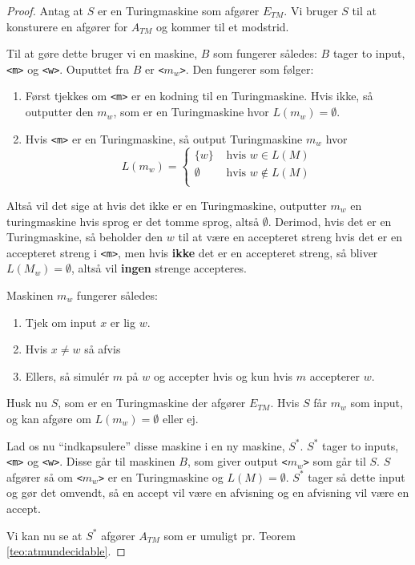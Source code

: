 \begin{proof}
	Antag at $S$ er en Turingmaskine som afgører $E_{TM}$. Vi bruger $S$ til at konsturere en afgører for $A_{TM}$ og kommer til et modstrid.

	Til at gøre dette bruger vi en maskine, $B$ som fungerer således: $B$ tager to input, \texttt{<m>} og \texttt{<w>}. Ouputtet fra $B$  er \texttt{<$m_{w}$>}. Den fungerer som følger:
	\begin{enumerate}
		\item Først tjekkes om \texttt{<m>} er en kodning til en Turingmaskine. Hvis ikke, så outputter den $m_{w}$, som er en Turingmaskine hvor $L(m_{w}) = \emptyset$.
		\item Hvis \texttt{<m>} er en Turingmaskine, så output Turingmaskine $m_{w}$ hvor
		      \begin{equation*}
			      L(m_{w}) =\begin{cases}
				      \{w\}     & \text{ hvis } w \in L(M)    \\
				      \emptyset & \text{ hvis } w \notin L(M) \\
			      \end{cases}
		      \end{equation*}
	\end{enumerate}
	Altså vil det sige at hvis det ikke er en Turingmaskine, outputter $m_{w}$ en turingmaskine hvis sprog er det tomme sprog, altså $\emptyset$. Derimod, hvis det er en Turingmaskine, så beholder den $w$ til at være en accepteret streng hvis det er en accepteret streng i \texttt{<m>}, men hvis \textbf{ikke} det er en accepteret streng, så bliver $L(M_{w}) = \emptyset$, altså vil \textbf{ingen} strenge accepteres.

	Maskinen $m_{w}$ fungerer således:
	\begin{enumerate}
		\item Tjek om input $x$ er lig $w$.
		\item Hvis $x \neq w$ så afvis
		\item Ellers, så simulér $m$ på $w$ og accepter hvis og kun hvis $m$ accepterer $w$.
	\end{enumerate}

	Husk nu $S$, som er en Turingmaskine der afgører $E_{TM}$. Hvis $S$ får $m_{w}$ som input, og kan afgøre om $L(m_{w}) = \emptyset$ eller ej.

	Lad os nu ``indkapsulere'' disse maskine i en ny maskine, $S^{*}$. $S^{*}$ tager to inputs, \texttt{<m>} og \texttt{<w>}. Disse går til maskinen $B$, som giver output \texttt{<$m_{w}$>} som går til $S$. $S$ afgører så om \texttt{<$m_{w}$>} er en Turingmaskine og $L(M) = \emptyset$. $S^{*}$ tager så dette input og gør det omvendt, så en accept vil være en afvisning og en afvisning vil være en accept.

	Vi kan nu se at $S^{*}$ afgører $A_{TM}$ som er umuligt pr. Teorem \ref{teo:atmundecidable}.


\end{proof}

